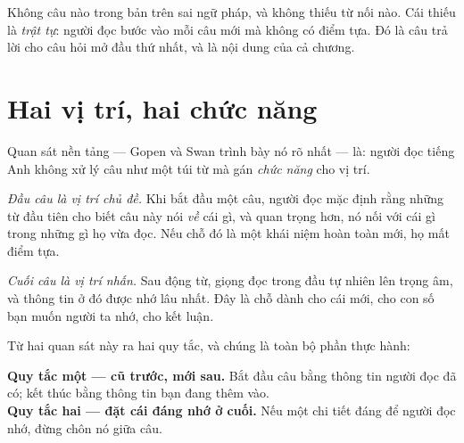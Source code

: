 \documentclass[../../english.tex]{subfiles}
\begin{document}
\begin{capdoi}
\end{capdoi}

Không câu nào trong bản trên sai ngữ pháp, và không thiếu từ nối nào. Cái thiếu là \emph{trật tự}: người đọc bước vào mỗi câu mới mà không có điểm tựa. Đó là câu trả lời cho câu hỏi mở đầu thứ nhất, và là nội dung của cả chương.

\section{Hai vị trí, hai chức năng}

Quan sát nền tảng --- Gopen và Swan trình bày nó rõ nhất\cite{gopenswan1990} --- là: người đọc tiếng Anh không xử lý câu như một túi từ mà gán \emph{chức năng} cho vị trí.

\emph{Đầu câu là vị trí chủ đề.} Khi bắt đầu một câu, người đọc mặc định rằng những từ đầu tiên cho biết câu này nói \emph{về} cái gì, và quan trọng hơn, nó nối với cái gì trong những gì họ vừa đọc. Nếu chỗ đó là một khái niệm hoàn toàn mới, họ mất điểm tựa.

\emph{Cuối câu là vị trí nhấn.} Sau động từ, giọng đọc trong đầu tự nhiên lên trọng âm, và thông tin ở đó được nhớ lâu nhất. Đây là chỗ dành cho cái mới, cho con số bạn muốn người ta nhớ, cho kết luận.

Từ hai quan sát này ra hai quy tắc, và chúng là toàn bộ phần thực hành:

\begin{cannho}
\textbf{Quy tắc một --- cũ trước, mới sau.} Bắt đầu câu bằng thông tin người đọc đã có; kết thúc bằng thông tin bạn đang thêm vào.\\[0.25em]
\textbf{Quy tắc hai --- đặt cái đáng nhớ ở cuối.} Nếu một chi tiết đáng để người đọc nhớ, đừng chôn nó giữa câu.
\end{cannho}
\end{document}
